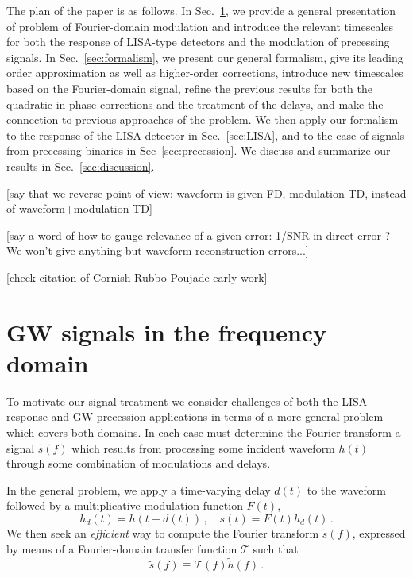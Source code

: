 \documentclass[aps,showpacs,twocolumn,
prd,superscriptaddress,nofootinbib]{revtex4-1}
\newcommand{\be}{\begin{equation}}
\newcommand{\ee}{\end{equation}}
\newcommand\calT{{\mathcal{T}}}
\newcommand{\SM}[1]{{\color{Red} #1}}
\newcommand{\jgb}[1]{{\color{DarkGreen} #1}}
\begin{document}
The plan of the paper is as follows. In Sec.~\ref{sec:motivation}, we provide a general presentation of problem of Fourier-domain modulation and introduce the relevant timescales for both the response of LISA-type detectors and the modulation of precessing signals. In Sec.~\ref{sec:formalism}, we present our general formalism, give its leading order approximation as well as higher-order corrections, introduce new timescales based on the Fourier-domain signal, refine the previous results for both the quadratic-in-phase corrections and the treatment of the delays, and make the connection to previous approaches of the problem. We then apply our formalism to the response of the LISA detector in Sec.~\ref{sec:LISA}, and to the case of signals from precessing binaries in Sec~\ref{sec:precession}. We discuss and summarize our results in Sec.~\ref{sec:discussion}.

\SM{[say that we reverse point of view: waveform is given FD, modulation TD, instead of waveform+modulation TD]}

\SM{[say a word of how to gauge relevance of a given error: 1/SNR in direct error ? We won't give anything but waveform reconstruction errors...]}

\SM{[check citation of Cornish-Rubbo-Poujade early work]}


\section{GW signals in the frequency domain}
\label{sec:motivation}



\jgb{To motivate our signal treatment we consider challenges of both the LISA response and GW precession applications in terms of a more general problem which covers both domains. In each case must determine the Fourier transform a signal $\tilde s(f)$ which results from processing some incident waveform $h(t)$ through some combination of modulations and delays.}

In the general problem, we apply a time-varying delay $d(t)$ to the waveform followed by a multiplicative modulation function $F(t)$,
\be
\label{eq:delay-mod-defs}
	h_{d}(t) = h(t+d(t)) \,, \quad s(t) = F(t)h_{d}(t) \,.
\ee
We then seek an \textit{efficient} way to compute the Fourier transform $\tilde{s}(f)$, expressed by means of a Fourier-domain transfer function $\calT$ such that
\be\label{eq:deftransfer}
	\tilde{s}(f) \equiv \calT(f) \tilde{h}(f) \,. 
\ee
\end{document}
